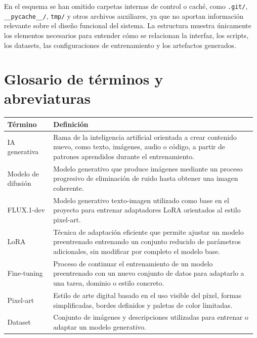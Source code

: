 \documentclass[a4paper,11pt,titlepage]{scrbook}
\begin{document}
En el esquema se han omitido carpetas internas de control o caché, como \texttt{.git/}, \texttt{\_\_pycache\_\_/}, \texttt{tmp/} y otros archivos auxiliares, ya que no aportan información relevante sobre el diseño funcional del sistema. La estructura muestra únicamente los elementos necesarios para entender cómo se relacionan la interfaz, los scripts, los datasets, las configuraciones de entrenamiento y los artefactos generados.


\chapter*{Glosario de términos y abreviaturas}

\begin{longtable}{|L{0.25\textwidth}|L{0.65\textwidth}|}
\hline
\textbf{Término} & \textbf{Definición} \\
\hline

IA generativa & Rama de la inteligencia artificial orientada a crear contenido nuevo, como texto, imágenes, audio o código, a partir de patrones aprendidos durante el entrenamiento. \\
\hline

Modelo de difusión & Modelo generativo que produce imágenes mediante un proceso progresivo de eliminación de ruido hasta obtener una imagen coherente. \\
\hline

FLUX.1-dev & Modelo generativo texto-imagen utilizado como base en el proyecto para entrenar adaptadores LoRA orientados al estilo pixel-art. \\
\hline

LoRA & Técnica de adaptación eficiente que permite ajustar un modelo preentrenado entrenando un conjunto reducido de parámetros adicionales, sin modificar por completo el modelo base. \\
\hline

Fine-tuning & Proceso de continuar el entrenamiento de un modelo preentrenado con un nuevo conjunto de datos para adaptarlo a una tarea, dominio o estilo concreto. \\
\hline

Pixel-art & Estilo de arte digital basado en el uso visible del píxel, formas simplificadas, bordes definidos y paletas de color limitadas. \\
\hline

Dataset & Conjunto de imágenes y descripciones utilizadas para entrenar o adaptar un modelo generativo. \\
\hline


\end{longtable}
\end{document}
